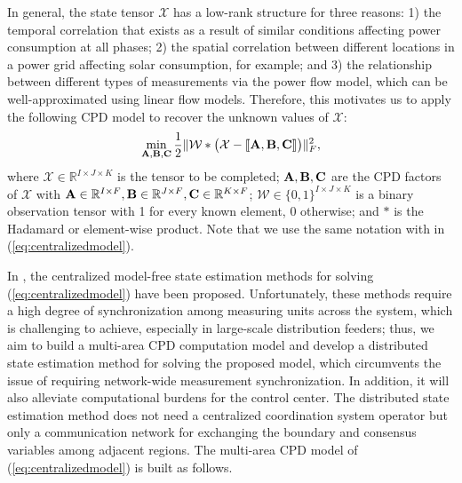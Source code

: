\documentclass[journal]{IEEEtran}
\newcounter{propose}
\newcommand{\cpd}[3]{\llbracket #1, #2, #3 \rrbracket}
\newcommand{\A}{{\bf A}}
\newcommand{\B}{{\bf B}}
\newcommand{\C}{{\bf C}}
\newcommand{\Ten}[1]{\mathcal{#1}}
\newcommand{\revision}[1]{{\color{black} #1}} %
\newcommand{\bA}{{\bf A}}
\newcommand{\bB}{{\bf B}}
\newcommand{\bC}{{\bf C}}
\begin{document}
In general, the state tensor $\Ten{X}$ has a low-rank structure for three reasons: 1) the  temporal correlation that exists as a result of similar conditions affecting power consumption at all phases; 2) the spatial correlation between different locations in a power grid affecting solar consumption, for example;  and  3) the  relationship  between  different  types  of  measurements via the power flow model, which can be well-approximated using linear flow models. Therefore, this motivates us to apply the following CPD model \cite{Zamzam2020} to recover the unknown values of $\Ten{X}$:
 \begin{align}\label{eq:centralizedmodel}
    \min_{\A, \B, \C} \frac{1}{2}\| \Ten{W} * \big(\Ten{X} - {\cpd{\A}{\B}{\C}} \big)\|_F^2,
\end{align}
where 
$\Ten{X}\in\mathbb{R}^{I\times J\times K}$ is the tensor to be completed; ${\A},{\B},{\C}$ are the CPD factors of $\Ten{X}$ with
$\bA\in\mathbb{R}^{I\times F}, \bB\in\mathbb{R}^{J\times F},\bC\in\mathbb{R}^{K\times F}$; 
$\Ten{W}\in \{0,1\}^{I\times J\times K}$ is a binary observation tensor with 1 for every known element, 0 otherwise; \revision{and $*$ is the Hadamard or element-wise product. Note that we use the same notation with \cite{tensorlab} in (\ref{eq:centralizedmodel}).}

In \cite{Zamzam2020}, the centralized model-free state estimation methods for solving (\ref{eq:centralizedmodel}) have been proposed. Unfortunately, these methods require a high degree of synchronization among measuring units across the system, which is challenging to achieve, especially in large-scale distribution feeders; thus, we aim to build a multi-area CPD computation model and develop a distributed state estimation method for solving the proposed model, which circumvents the issue of requiring network-wide measurement synchronization. In addition, it will  also alleviate computational burdens for the control center. The distributed state estimation method does not need a centralized coordination system operator but only a communication network for exchanging the boundary and consensus variables among adjacent regions. The multi-area CPD model of (\ref{eq:centralizedmodel}) is built as follows.
\end{document}
